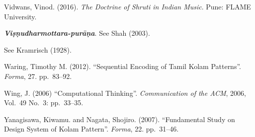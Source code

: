 \begin{thebibliography}{99}
Vidwans, Vinod. (2016). \textsl{The Doctrine of Shruti in Indian Music}. Pune: FLAME University.

\textsl{\textbf{Viṣṇudharmottara-purāṇa}}. See Shah (2003). 

\hspace{3.3cm} See Kramrisch (1928).

Waring, Timothy M. (2012). “Sequential Encoding of Tamil Kolam Patterns”. \textsl{Forma}, 27. pp.~83--92.

Wing, J. (2006) “Computational Thinking”. \textsl{Communication of the ACM}, 2006, Vol.~49 No.~3: pp.~33--35.

Yanagisawa, Kiwamu. and Nagata, Shojiro. (2007). “Fundamental Study on Design System of Kolam Pattern”. \textsl{Forma}, 22. pp.~31--46.

\end{thebibliography}

\theendnotes
\label{chapter-3:end}
